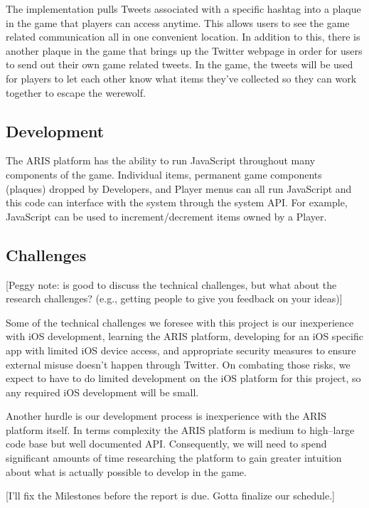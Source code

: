 \documentclass{sigchi}
\begin{document}
The implementation pulls Tweets associated with a specific hashtag into a plaque in the game that players can access anytime. This allows users to see the game related communication all in one convenient location. In addition to this, there is another plaque in the game that brings up the Twitter webpage in order for users to send out their own game related tweets. In the game, the tweets will be used for players to let each other know what items they’ve collected so they can work together to escape the werewolf. 

\subsection{Development}
The ARIS platform has the ability to run JavaScript throughout many components of the game. Individual items, permanent game components (plaques) dropped by Developers, and Player menus can all run JavaScript and this code can interface with the system through the system API. For example, JavaScript can be used to increment/decrement items owned by a Player. 

\subsection{Challenges}
[Peggy note: is good to discuss the technical challenges, but what about the research challenges?  (e.g., getting people to give you feedback on your ideas)]

Some of the technical challenges we foresee with this project is our inexperience with iOS development, learning the ARIS platform, developing for an iOS specific app with limited iOS device access, and appropriate security measures to ensure external misuse doesn't happen through Twitter. On combating those risks, we expect to have to do limited development on the iOS platform for this project, so any required iOS development will be small. 

Another hurdle is our development process is inexperience with the ARIS platform itself. In terms complexity the ARIS platform is medium to high--large code base but well documented API. Consequently, we will need to spend significant amounts of time researching the platform to gain greater intuition about what is actually possible to develop in the game.

[I'll fix the Milestones before the report is due. Gotta finalize our schedule.]
\end{document}
